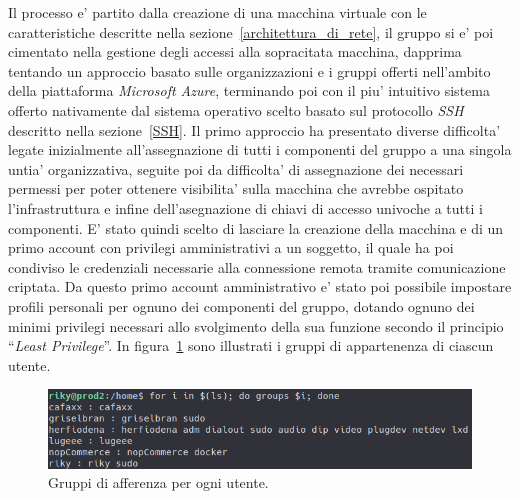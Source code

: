\documentclass[a4paper]{report}
\newcommand{\quotes}[1]{``#1''}
\begin{document}
		Il processo e' partito dalla creazione di una macchina virtuale con le caratteristiche descritte nella
		sezione~\ref{architettura_di_rete}, il gruppo si e' poi cimentato nella gestione degli accessi alla sopracitata
		macchina, dapprima tentando un approccio basato sulle organizzazioni e i gruppi offerti nell'ambito della
		piattaforma \emph{Microsoft Azure}, terminando poi con il piu' intuitivo sistema offerto nativamente dal sistema
		operativo scelto basato sul protocollo \emph{SSH} descritto nella sezione~\ref{SSH}.
		Il primo approccio ha presentato diverse difficolta' legate inizialmente all'assegnazione di tutti i componenti
		del gruppo a una singola untia' organizzativa, seguite poi da difficolta' di assegnazione dei necessari permessi
		per poter ottenere visibilita' sulla macchina che avrebbe ospitato l'infrastruttura e infine dell'asegnazione di
		chiavi di accesso univoche a tutti i componenti. E' stato quindi scelto di lasciare la creazione della macchina
		e di un primo account con privilegi amministrativi a un soggetto, il quale ha poi condiviso le credenziali
		necessarie alla connessione remota tramite comunicazione criptata. Da questo primo account amministrativo e'
		stato poi possibile impostare profili personali per ognuno dei componenti del gruppo, dotando ognuno dei minimi
		privilegi necessari allo svolgimento della sua funzione secondo il principio \quotes{\emph{Least Privilege}}. In
		figura~\ref{fig:utenti_e_gruppi} sono illustrati i gruppi di appartenenza di ciascun utente.

		\begin{figure}[H]
			\includegraphics[width=\textwidth]{UtentiEGruppi.png}
			\caption{Gruppi di afferenza per ogni utente.}\label{fig:utenti_e_gruppi}
		\end{figure}
\end{document}
